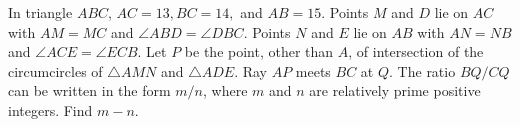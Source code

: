\documentclass[11pt]{article}
\theoremstyle{definition}
\begin{document}
%	













\begin{question}[name={2010 AIME II, \href{https://artofproblemsolving.com/community/c4p1831368}{Problem 15}}]
	In triangle $ ABC$, $ AC = 13, BC = 14,$ and $ AB=15$. Points $ M$ and $ D$ lie on $ AC$ with $ AM=MC$ and $ \angle ABD = \angle DBC$. Points $ N$ and $ E$ lie on $ AB$ with $ AN=NB$ and $ \angle ACE = \angle ECB$. Let $ P$ be the point, other than $ A$, of intersection of the circumcircles of $ \triangle AMN$ and $ \triangle ADE$. Ray $ AP$ meets $ BC$ at $ Q$. The ratio $ {BQ}/{CQ}$ can be written in the form ${m}/{n}$, where $ m$ and $ n$ are relatively prime positive integers. Find $ m-n$.
\end{question}
\end{document}
